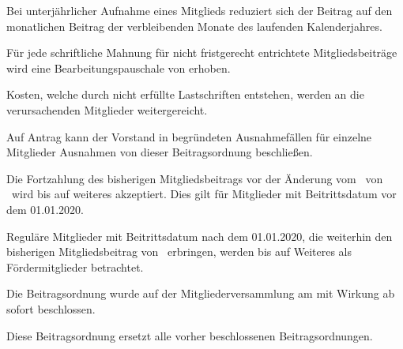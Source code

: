 \documentclass[parskip=half]{scrartcl}
\begin{document}
\begin{contract}
Bei unterjährlicher Aufnahme eines Mitglieds reduziert sich der Beitrag auf den monatlichen Beitrag der verbleibenden Monate des laufenden Kalenderjahres.

Für jede schriftliche Mahnung für nicht fristgerecht entrichtete Mitgliedsbeiträge wird eine Bearbeitungspauschale von \reminderFee{} erhoben.

Kosten, welche durch nicht erfüllte Lastschriften entstehen, werden an die verursachenden Mitglieder weitergereicht. 

\Clause[title={Ausnahmen}]

Auf Antrag kann der Vorstand in begründeten Ausnahmefällen für einzelne Mitglieder Ausnahmen von dieser Beitragsordnung beschließen. 

\Clause[title={Inkrafttreten/Übergangsbestimmungen}]

Die Fortzahlung des bisherigen Mitgliedsbeitrags vor der Änderung vom \issuedOnDate{}\ von \membershipFeeOld{}\  wird bis auf weiteres akzeptiert. Dies gilt für Mitglieder mit Beitrittsdatum vor dem 01.01.2020.

Reguläre Mitglieder mit Beitrittsdatum nach dem 01.01.2020, die weiterhin den bisherigen Mitgliedsbeitrag von \membershipFeeOld{}\ erbringen, werden bis auf Weiteres als Fördermitglieder betrachtet.

Die Beitragsordnung wurde auf der Mitgliederversammlung am \issuedOnDate{}  mit Wirkung ab sofort beschlossen. 

Diese Beitragsordnung ersetzt alle vorher beschlossenen Beitragsordnungen.

\end{contract}
 
\end{document}

